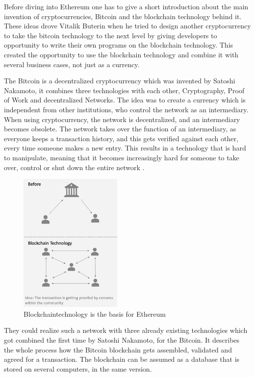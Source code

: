 Before diving into Ethereum one has to give a short introduction about the main invention of cryptocurrencies, Bitcoin and the blockchain technology behind it. 
These ideas drove Vitalik Buterin when he tried to design another cryptocurrency to take the bitcoin technology to the next level by giving developers to opportunity to write their own programs on the blockchain technology. 
This created the opportunity to use the blockchain technology and combine it with several business cases, not just as a currency\cite{vitalikwhite}. 

The Bitcoin is a decentralized cryptocurrency which was invented by Satoshi Nakamoto, it combines three technologies with each other, Cryptography, Proof of Work and decentralized Networks. The idea was to create a currency which is independent from other institutions, who control the network as an intermediary. When using cryptocurrency, the network is decentralized, and an intermediary becomes obsolete. 
The network takes over the function of an intermediary, as everyone keeps a transaction history, and this gets verified against each other, every time someone makes a new entry.
This results in a technology that is hard to manipulate, meaning that it becomes increasingly hard for someone to take over, control or shut down the entire network \cite{grishchenko2018semantic}.

\begin{figure}[ht]
\centering
\caption{Blockchaintechnology is the basis for Ethereum} 
\includegraphics[width=0.45\textwidth]{blockchaintech}
\end{figure}

They could realize such a network with three already existing technologies which got combined the first time by Satoshi Nakamoto, for the Bitcoin. 
It describes the whole process how the Bitcoin blockchain gets assembled, validated and agreed for a transaction. 
The blockchain can be assumed as a database that is stored on several computers, in the same version\cite{grishchenko2018semantic}.

